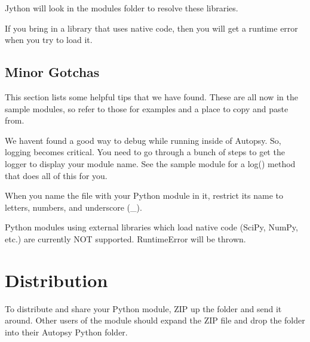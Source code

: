 Jython will look in the module\textquotesingle{}s folder to resolve these libraries.

If you bring in a library that uses native code, then you will get a runtime error when you try to load it.\hypertarget{mod_dev_py_page_mod_dev_py_misc}{}\subsection{Minor Gotchas}\label{mod_dev_py_page_mod_dev_py_misc}
This section lists some helpful tips that we have found. These are all now in the sample modules, so refer to those for examples and a place to copy and paste from.
\begin{DoxyItemize}
\item We haven\textquotesingle{}t found a good way to debug while running inside of Autopsy. So, logging becomes critical. You need to go through a bunch of steps to get the logger to display your module name. See the sample module for a log() method that does all of this for you.
\item When you name the file with your Python module in it, restrict its name to letters, numbers, and underscore (\+\_\+).
\item Python modules using external libraries which load native code (Sci\+Py, Num\+Py, etc.) are currently N\+OT supported. Runtime\+Error will be thrown.
\end{DoxyItemize}\hypertarget{mod_dev_py_page_mod_dev_py_distribute}{}\section{Distribution}\label{mod_dev_py_page_mod_dev_py_distribute}
To distribute and share your Python module, Z\+IP up the folder and send it around. Other users of the module should expand the Z\+IP file and drop the folder into their Autopsy Python folder. 